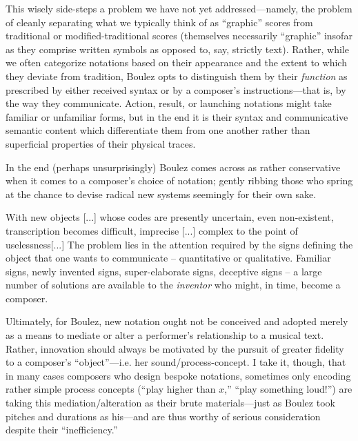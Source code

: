     This wisely side-steps a problem we have not yet addressed---namely, the problem of cleanly separating what we typically think of as ``graphic'' scores from traditional or modified-traditional scores (themselves necessarily ``graphic''  insofar as they comprise written symbols as opposed to, say, strictly text). Rather, while we often categorize notations based on their appearance and the extent to which they deviate from tradition, Boulez opts to distinguish them by their \textit{function} as prescribed by either received syntax or by a composer's instructions---that is, by the way they communicate. Action, result, or launching notations might take familiar or unfamiliar forms, but in the end it is their syntax and communicative semantic content which differentiate them from one another rather than superficial properties of their physical traces.

    In the end (perhaps unsurprisingly) Boulez comes across as rather conservative when it comes to a composer's choice of notation; gently ribbing those who spring at the chance to devise radical new systems seemingly for their own sake.

    \begin{smallquote}
        With new objects [...] whose codes are presently uncertain, even non-existent, transcription becomes difficult, imprecise [...] complex to the point of uselessness[...] The problem lies in the attention required by the signs defining the object that one wants to communicate -- quantitative or qualitative. Familiar signs, newly invented signs, super-elaborate signs, deceptive signs -- a large number of solutions are available to the \textit{inventor} who might, in time, become a composer.\autocite[532]{Boulez_Nattiez_2019}
    \end{smallquote}

    \noindent Ultimately, for Boulez, new notation ought not be conceived and adopted merely as a means to mediate or alter a performer's relationship to a musical text. Rather, innovation should always be motivated by the pursuit of greater fidelity to a composer's ``object''---i.e. her sound/process-concept. I take it, though, that in many cases composers who design bespoke notations, sometimes only encoding rather simple process concepts (``play higher than $x$,'' ``play something loud!'') are taking this mediation/alteration as their brute materials---just as Boulez took pitches and durations as his---and are thus worthy of serious consideration despite their ``inefficiency.''

